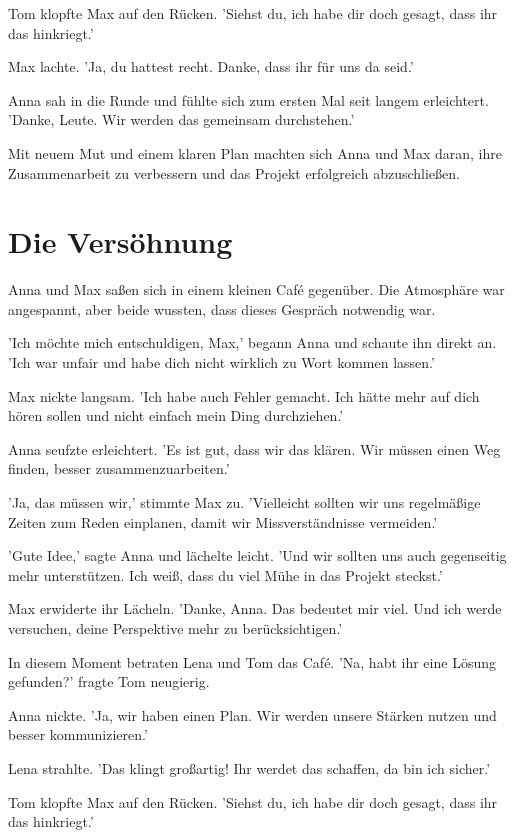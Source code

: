 \documentclass[12pt]{article}
\begin{document}
Tom klopfte Max auf den Rücken. 'Siehst du, ich habe dir doch gesagt, dass ihr das hinkriegt.'

Max lachte. 'Ja, du hattest recht. Danke, dass ihr für uns da seid.'

Anna sah in die Runde und fühlte sich zum ersten Mal seit langem erleichtert. 'Danke, Leute. Wir werden das gemeinsam durchstehen.'

Mit neuem Mut und einem klaren Plan machten sich Anna und Max daran, ihre Zusammenarbeit zu verbessern und das Projekt erfolgreich abzuschließen.

\section{ Die Versöhnung }
 Anna und Max saßen sich in einem kleinen Café gegenüber. Die Atmosphäre war angespannt, aber beide wussten, dass dieses Gespräch notwendig war.

'Ich möchte mich entschuldigen, Max,' begann Anna und schaute ihn direkt an. 'Ich war unfair und habe dich nicht wirklich zu Wort kommen lassen.'

Max nickte langsam. 'Ich habe auch Fehler gemacht. Ich hätte mehr auf dich hören sollen und nicht einfach mein Ding durchziehen.'

Anna seufzte erleichtert. 'Es ist gut, dass wir das klären. Wir müssen einen Weg finden, besser zusammenzuarbeiten.'

'Ja, das müssen wir,' stimmte Max zu. 'Vielleicht sollten wir uns regelmäßige Zeiten zum Reden einplanen, damit wir Missverständnisse vermeiden.'

'Gute Idee,' sagte Anna und lächelte leicht. 'Und wir sollten uns auch gegenseitig mehr unterstützen. Ich weiß, dass du viel Mühe in das Projekt steckst.'

Max erwiderte ihr Lächeln. 'Danke, Anna. Das bedeutet mir viel. Und ich werde versuchen, deine Perspektive mehr zu berücksichtigen.'

In diesem Moment betraten Lena und Tom das Café. 'Na, habt ihr eine Lösung gefunden?' fragte Tom neugierig.

Anna nickte. 'Ja, wir haben einen Plan. Wir werden unsere Stärken nutzen und besser kommunizieren.'

Lena strahlte. 'Das klingt großartig! Ihr werdet das schaffen, da bin ich sicher.'

Tom klopfte Max auf den Rücken. 'Siehst du, ich habe dir doch gesagt, dass ihr das hinkriegt.'
\end{document}
